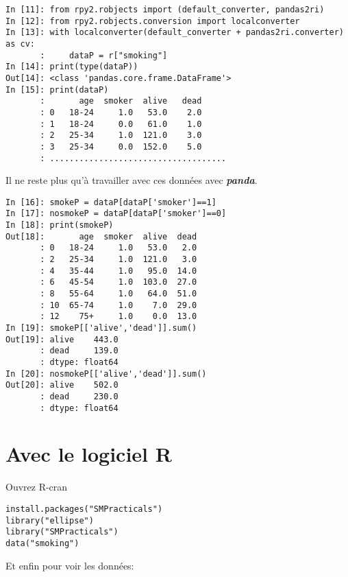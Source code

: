 \documentclass[10pt,dvipsnames, dvips, svgnames]{article}
\begin{document}
\begin{lstlisting}
In [11]: from rpy2.robjects import (default_converter, pandas2ri)
In [12]: from rpy2.robjects.conversion import localconverter
In [13]: with localconverter(default_converter + pandas2ri.converter) as cv:
       :     dataP = r["smoking"]
In [14]: print(type(dataP))
Out[14]: <class 'pandas.core.frame.DataFrame'>
In [15]: print(dataP)
       :       age  smoker  alive   dead
       : 0   18-24     1.0   53.0    2.0
       : 1   18-24     0.0   61.0    1.0
       : 2   25-34     1.0  121.0    3.0
       : 3   25-34     0.0  152.0    5.0
       : ....................................
\end{lstlisting}


Il ne reste plus qu'à travailler avec ces données avec \textbf{\textit{panda}}.


\begin{lstlisting}
In [16]: smokeP = dataP[dataP['smoker']==1]
In [17]: nosmokeP = dataP[dataP['smoker']==0]
In [18]: print(smokeP)
Out[18]:       age  smoker  alive  dead
       : 0   18-24     1.0   53.0   2.0
       : 2   25-34     1.0  121.0   3.0
       : 4   35-44     1.0   95.0  14.0
       : 6   45-54     1.0  103.0  27.0
       : 8   55-64     1.0   64.0  51.0
       : 10  65-74     1.0    7.0  29.0
       : 12    75+     1.0    0.0  13.0
In [19]: smokeP[['alive','dead']].sum()
Out[19]: alive    443.0
       : dead     139.0
       : dtype: float64
In [20]: nosmokeP[['alive','dead']].sum()
Out[20]: alive    502.0
       : dead     230.0
       : dtype: float64
\end{lstlisting}



\section{Avec le logiciel R}


Ouvrez  R-cran 

\begin{lstlisting}
install.packages("SMPracticals")
library("ellipse")
library("SMPracticals")
data("smoking")
\end{lstlisting}

Et enfin pour voir les données: 
\end{document}
